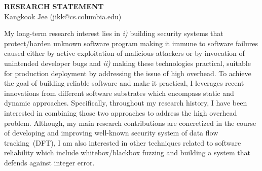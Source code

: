 \documentclass[letterpaper, 10pt]{article}
\begin{document}
\begin{small}

\begin{center}
{\LARGE \bf RESEARCH STATEMENT}\\
\vspace*{0.1cm}
{\normalsize Kangkook Jee (jikk@cs.columbia.edu)}
\end{center}



My long-term research interest lies in {\it i)} building security systems that
protect/harden unknown software program making it immune to software failures
caused either by active exploitation of malicious attackers or by invocation of
unintended developer bugs and {\it ii)} making these technologies practical,
suitable for production deployment by addressing the issue of high overhead.
%
To achieve the goal of building reliable software and make it practical, I
leverages recent innovations from different software substrates which encompass
static and dynamic approaches. Specifically, throughout my research history, I
have been interested in combining those two approaches to address the high
overhead problem. 
%
Although, my main research contributions are concretized in the course of
developing and improving well-known security system of data flow tracking~(DFT), I
am also interested in other techniques related to software reliability which
include whitebox/blackbox fuzzing and building a system that defends against
integer error. 


\end{small}
\end{document}
